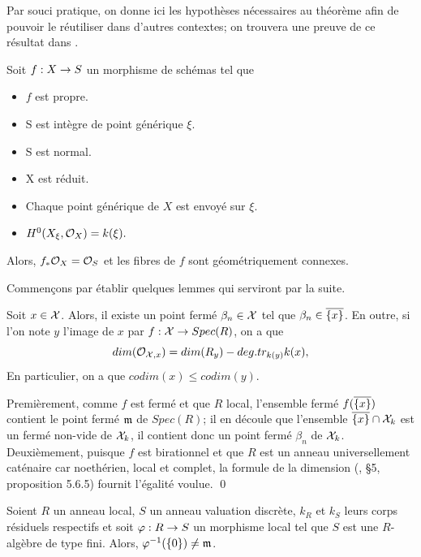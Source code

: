 \documentclass[11pt]{article}
\begin{document}
Par souci pratique, on donne ici les hypothèses nécessaires au théorème afin de pouvoir le réutiliser dans d'autres contextes; on trouvera une preuve de ce résultat dans  \cite[\href{https://stacks.math.columbia.edu/tag/0AY8}{Lemma 0AY8}]{stacks-project}.


\begin{lemme}\label{lemstein}
    Soit $f : X \rightarrow S$ un morphisme de schémas tel que
\begin{itemize}
    \item $f$ est propre.
    \item S est intègre de point générique $\xi$.
    \item S est normal.
    \item X est réduit.
    \item Chaque point générique de $X$ est envoyé sur $\xi$.
    \item $H^0(X_{\xi},\mathcal{O}_X) = k(\xi).$
\end{itemize}    
Alors, $f_*\mathcal{O}_X = \mathcal{O}_S$ et les fibres de $f$ sont géométriquement connexes.
\end{lemme}


Commençons par établir quelques lemmes qui serviront par la suite.

\begin{lemme}\label{lemdimension}
    Soit $x \in \mathcal{X}$. Alors, il existe un point fermé $\beta_n \in \mathcal{X}$ tel que $\beta_n \in \overline{\{x\}}$. En outre, si l'on note $y$ l'image de $x$ par $f : \mathcal{X} \rightarrow Spec(R)$, on a que 
 $$
dim(\mathcal{O}_{\mathcal{X},x}) = dim(R_{y}) - deg.tr_{k(y)}k(x),
$$
En particulier, on a que $codim(x) \leq codim(y).$  
\end{lemme}

\proof
Premièrement, comme $f$ est fermé et que $R$ local, l'ensemble fermé $f(\overline{\{x\}})$ contient le point fermé $\mathfrak{m}$ de $Spec(R)$; il en découle que l'ensemble $\overline{\{x\}} \cap \mathcal{X}_k$ est un fermé non-vide de $\mathcal{X}_k$, il contient donc un point fermé $\beta_n$ de $\mathcal{X}_k$.\\
Deuxièmement, puisque $f$ est birationnel et que $R$ est un anneau universellement caténaire car noethérien, local et complet, la formule de la dimension (\cite{PMIHES_1965__24__5_0}, §5, proposition 5.6.5) fournit l'égalité voulue.
\qed
\begin{lemme}\label{lemannvaldis}
    Soient $R$ un anneau local, $S$ un anneau valuation discrète, $k_R$ et $k_S$ leurs corps résiduels respectifs et soit $\varphi : R \rightarrow S$ un morphisme local tel que $S$ est une $R$-algèbre de type fini. Alors, $\varphi^{-1}(\{0\}) \neq \mathfrak{m} $.
\end{lemme}
\end{document}
